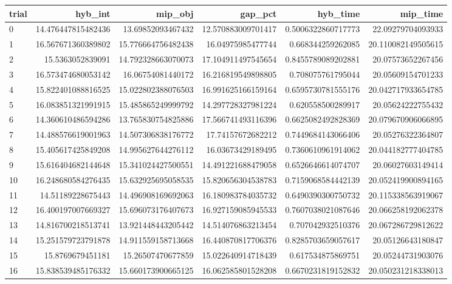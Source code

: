 \begin{tabular}{lrrrrr}
\hline
trial & hyb_int & mip_obj & gap_pct & hyb_time & mip_time \\ \hline
0 & 14.476447815482436 & 13.69852093467432 & 12.570883009701417 & 0.5006322860717773 & 22.09279704093933 \\
1 & 16.567671360389802 & 15.776664756482438 & 16.04975985477744 & 0.668344259262085 & 20.110082149505615 \\
2 & 15.5363052839091 & 14.792328663070073 & 17.104911497545654 & 0.8455789089202881 & 20.07573652267456 \\
3 & 16.573474680053142 & 16.06754081440172 & 16.216819549898805 & 0.708075761795044 & 20.05609154701233 \\
4 & 15.822401088816525 & 15.022802388076503 & 16.991625166159164 & 0.6595730781555176 & 20.042717933654785 \\
5 & 16.083851321991915 & 15.485865249999792 & 14.297728327981224 & 0.620558500289917 & 20.05624222755432 \\
6 & 14.360610486594286 & 13.765830754825886 & 17.566741493116396 & 0.6625082492828369 & 20.079670906066895 \\
7 & 14.488576619001963 & 14.507306838176772 & 17.74157672682212 & 0.7449684143066406 & 20.05276322364807 \\
8 & 15.405617425849208 & 14.995627644276112 & 16.03673429189495 & 0.7360610961914062 & 20.044182777404785 \\
9 & 15.616404682144648 & 15.341024427500551 & 14.491221688479058 & 0.6526646614074707 & 20.06027603149414 \\
10 & 16.248680584276435 & 15.632925695058535 & 15.820656304538783 & 0.7159068584442139 & 20.052419900894165 \\
11 & 14.51189228675443 & 14.496908169692063 & 16.180983784035732 & 0.6490390300750732 & 20.115338563919067 \\
12 & 16.400197007669327 & 15.696073176407673 & 16.927159085945533 & 0.7607038021087646 & 20.066258192062378 \\
13 & 14.816700218513741 & 13.921448443205442 & 14.514076863213454 & 0.707042932510376 & 20.067286729812622 \\
14 & 15.251579723791878 & 14.911559158713668 & 16.440870817706376 & 0.8285703659057617 & 20.05126643180847 \\
15 & 15.8769679451181 & 15.26507470677859 & 15.022640914718439 & 0.617534875869751 & 20.05244731903076 \\
16 & 15.838539485176332 & 15.660173900665125 & 16.062585801528208 & 0.6670231819152832 & 20.050231218338013 \\

\end{tabular}
